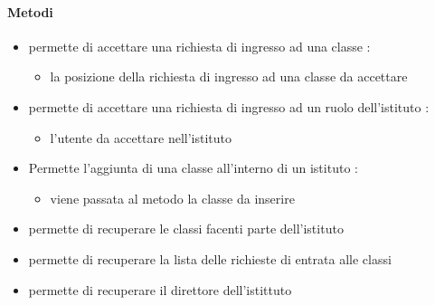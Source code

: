 \paragraph{Metodi}
\begin{itemize}
\item {}
\newline
permette di accettare una richiesta di ingresso ad una classe
\newline
{} :
\begin{itemize}
\item {}
\newline
la posizione della richiesta di ingresso ad una classe da accettare
\end{itemize}
\item {}
\newline
permette di accettare una richiesta di ingresso ad un ruolo dell'istituto
\newline
{} :
\begin{itemize}
\item {}
\newline
l'utente da accettare nell'istituto
\end{itemize}
\item {}
\newline
Permette l'aggiunta di una classe all'interno di un istituto
\newline
{} :
\begin{itemize}
\item {}
\newline
viene passata al metodo la classe da inserire
\end{itemize}
\item {}
\newline
permette di recuperare le classi facenti parte dell'istituto
\newline
\item {}
\newline
permette di recuperare la lista delle richieste di entrata alle classi
\newline
\item {}
\newline
permette di recuperare il direttore dell'istittuto

\end{itemize}
